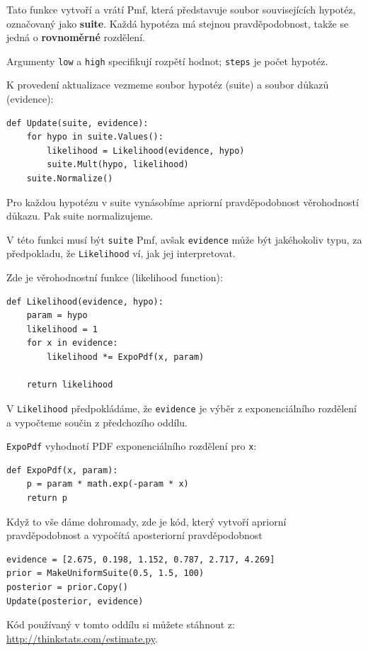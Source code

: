 \documentclass[12pt]{book}
\begin{document}
Tato funkce vytvoří a vrátí Pmf, která představuje soubor souvisejících hypotéz, označovaný jako {\bf suite}.  Každá hypotéza má stejnou pravděpodobnost, takže se jedná o {\bf rovnoměrné} rozdělení.

Argumenty {\tt low} a {\tt high} specifikují rozpětí hodnot; {\tt steps} je počet hypotéz.

K provedení aktualizace vezmeme soubor hypotéz (suite) a soubor důkazů (evidence):
%
\begin{verbatim}
def Update(suite, evidence):
    for hypo in suite.Values():
        likelihood = Likelihood(evidence, hypo)
        suite.Mult(hypo, likelihood)
    suite.Normalize()
\end{verbatim}

Pro každou hypotézu v suite vynásobíme apriorní pravděpodobnost věrohodností důkazu. Pak suite normalizujeme.

V této funkci musí být {\tt suite} Pmf, avšak {\tt evidence}
může být jakéhokoliv typu, za předpokladu, že {\tt Likelihood} ví, jak jej interpretovat.

Zde je věrohodnostní funkce (likelihood function):
%
\begin{verbatim}
def Likelihood(evidence, hypo):
    param = hypo
    likelihood = 1
    for x in evidence:
        likelihood *= ExpoPdf(x, param)

    return likelihood
\end{verbatim}

V {\tt Likelihood} předpokládáme, že {\tt evidence} je výběr z exponenciálního rozdělení a vypočteme součin z předchozího oddílu.

{\tt ExpoPdf} vyhodnotí PDF exponenciálního rozdělení pro
{\tt x}:
%
\begin{verbatim}
def ExpoPdf(x, param):
    p = param * math.exp(-param * x)
    return p
\end{verbatim}

Když to vše dáme dohromady, zde je kód, který vytvoří apriorní pravděpodobnost a vypočítá aposteriorní pravděpodobnost
%
\begin{verbatim}
evidence = [2.675, 0.198, 1.152, 0.787, 2.717, 4.269]
prior = MakeUniformSuite(0.5, 1.5, 100)
posterior = prior.Copy()
Update(posterior, evidence)
\end{verbatim}

Kód používaný v tomto oddílu si můžete stáhnout z:
\url{http://thinkstats.com/estimate.py}.
\end{document}
